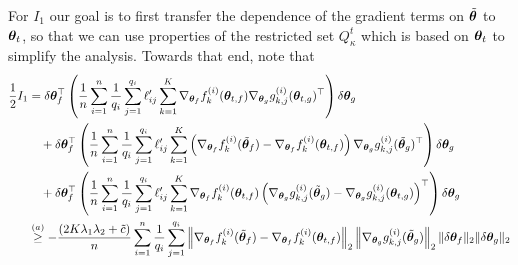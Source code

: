 For $I_1$ our goal is to first transfer the dependence of the gradient terms on $\tilde{{\bm{\theta}}}$ to ${\bm{\theta}}_t$, so that we can use properties of the restricted set $Q^t_{\kappa}$ which is based on ${\bm{\theta}}_t$ to simplify the analysis. Towards that end, note that 
\begin{align*}
    \frac{1}{2}I_1 & = \delta \vtheta_f^\top \left(\frac{1}{n} \sum_{i=1}^n \frac{1}{q_i} \sum_{j=1}^{q_i} \ell'_{ij} \sum_{k=1}^K \nabla_{\vtheta_f} f_k^{(i)}(\vtheta_{t,f}) \nabla_{\vtheta_g} g_{k,j}^{(i)}(\vtheta_{t,g})^\top \right) \delta \vtheta_g \\
    & \quad + \delta \vtheta_f^\top \left(\frac{1}{n} \sum_{i=1}^n \frac{1}{q_i} \sum_{j=1}^{q_i} \ell'_{ij} \sum_{k=1}^K \left( \nabla_{\vtheta_f} f_k^{(i)}(\tilde{\vtheta}_f) - \nabla_{\vtheta_f} f_k^{(i)}(\vtheta_{t,f}) \right) \nabla_{\vtheta_g} g_{k,j}^{(i)}(\tilde{\vtheta}_g)^\top \right) \delta \vtheta_g \\
    & \quad + \delta \vtheta_f^\top \left(\frac{1}{n} \sum_{i=1}^n \frac{1}{q_i} \sum_{j=1}^{q_i} \ell'_{ij} \sum_{k=1}^K \nabla_{\vtheta_f} f_k^{(i)}(\vtheta_{t,f}) \left( \nabla_{\vtheta_g} g_{k,j}^{(i)}(\tilde{\vtheta}_g) - \nabla_{\vtheta_g} g_{k,j}^{(i)}(\vtheta_{t,g}) \right)^\top \right) \delta \vtheta_g \\
    & \overset{(a)}{\geq} -  \frac{(2K\lambda_1\lambda_2+\tilde{c})}{n} \sum_{i=1}^n \frac{1}{q_i} \sum_{j=1}^{q_i}  \left\| \nabla_{\vtheta_f} f_k^{(i)}(\tilde{\vtheta}_f) - \nabla_{\vtheta_f} f_k^{(i)}(\vtheta_{t,f}) \right\|_2 \left\| \nabla_{\vtheta_g} g_{k,j}^{(i)}(\tilde{\vtheta}_g) \right\|_2 \| \delta \vtheta_f \|_2 \| \delta \vtheta_g \|_2  \\

\end{align*}
